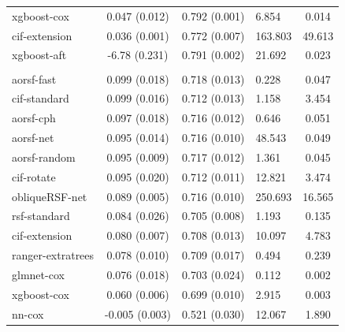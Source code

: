 \documentclass[twoside,11pt]{article}\usepackage[]{graphicx}\usepackage[]{xcolor}
\newenvironment{knitrout}{}{} %
\begin{document}
\begin{knitrout}
\begin{longtable}[t]{lcclc}
\hspace{1em}xgboost-cox & 0.047 (0.012) & 0.792 (0.001) & 6.854 & 0.014\\
\hspace{1em}cif-extension & 0.036 (0.001) & 0.772 (0.007) & 163.803 & 49.613\\
\hspace{1em}xgboost-aft & -6.78 (0.231) & 0.791 (0.002) & 21.692 & 0.023\\
\addlinespace[0.3em]
\hline
\multicolumn{5}{l}{\textit{\textbf{Colon cancer; death, n = 929, p = 12}}}\\
\hline
\hspace{1em}aorsf-fast & 0.099 (0.018) & 0.718 (0.013) & 0.228 & 0.047\\
\hspace{1em}cif-standard & 0.099 (0.016) & 0.712 (0.013) & 1.158 & 3.454\\
\hspace{1em}aorsf-cph & 0.097 (0.018) & 0.716 (0.012) & 0.646 & 0.051\\
\hspace{1em}aorsf-net & 0.095 (0.014) & 0.716 (0.010) & 48.543 & 0.049\\
\hspace{1em}aorsf-random & 0.095 (0.009) & 0.717 (0.012) & 1.361 & 0.045\\
\hspace{1em}cif-rotate & 0.095 (0.020) & 0.712 (0.011) & 12.821 & 3.474\\
\hspace{1em}obliqueRSF-net & 0.089 (0.005) & 0.716 (0.010) & 250.693 & 16.565\\
\hspace{1em}rsf-standard & 0.084 (0.026) & 0.705 (0.008) & 1.193 & 0.135\\
\hspace{1em}cif-extension & 0.080 (0.007) & 0.708 (0.013) & 10.097 & 4.783\\
\hspace{1em}ranger-extratrees & 0.078 (0.010) & 0.709 (0.017) & 0.494 & 0.239\\
\hspace{1em}glmnet-cox & 0.076 (0.018) & 0.703 (0.024) & 0.112 & 0.002\\
\hspace{1em}xgboost-cox & 0.060 (0.006) & 0.699 (0.010) & 2.915 & 0.003\\
\hspace{1em}nn-cox & -0.005 (0.003) & 0.521 (0.030) & 12.067 & 1.890\\

\end{longtable}
\end{knitrout}
\end{document}
